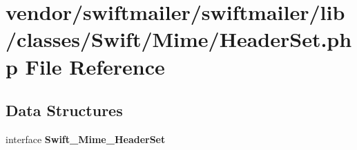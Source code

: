 \section{vendor/swiftmailer/swiftmailer/lib/classes/\+Swift/\+Mime/\+Header\+Set.php File Reference}
\label{_header_set_8php}
\subsection*{Data Structures}
\begin{DoxyCompactItemize}
\item 
interface {\bf Swift\+\_\+\+Mime\+\_\+\+Header\+Set}
\end{DoxyCompactItemize}

